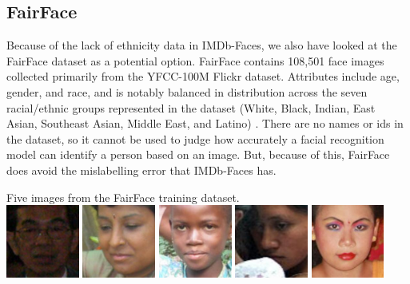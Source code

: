 \documentclass{article}
\begin{document}
\subsection{FairFace}
Because of the lack of ethnicity data in IMDb-Faces, we also have looked at the FairFace dataset as a potential option. FairFace contains 108,501 face
images collected primarily from the YFCC-100M Flickr dataset. Attributes include age, gender, and race, and is notably balanced in distribution across the seven racial/ethnic groups represented in the dataset (White, Black, Indian, East Asian, Southeast Asian,
Middle East, and Latino)  \cite{krkkinen2019fairface}. There are no names or ids in the dataset, so it cannot be used to judge how accurately a facial recognition model can identify a person based on an image. But, because of this, FairFace does avoid the mislabelling error that IMDb-Faces has.
\begin{center} 
Five images from the FairFace training dataset.
\\
{\includegraphics[width=0.18\textwidth]{fairface_1.jpg}}
{\includegraphics[width=0.18\textwidth]{fairface_2.jpg}}
{\includegraphics[width=0.18\textwidth]{fairface_3.jpg}}
{\includegraphics[width=0.18\textwidth]{fairface_4.jpg}}
{\includegraphics[width=0.18\textwidth]{fairface_5.jpg}}
\end{center}
\end{document}
